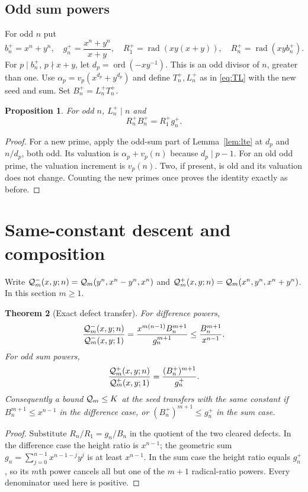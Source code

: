 \documentclass[11pt]{article}
\newtheorem{theorem}{Theorem}[section]
\newtheorem{proposition}[theorem]{Proposition}
\theoremstyle{definition}\newtheorem{definition}[theorem]{Definition}
\theoremstyle{remark}\newtheorem{remark}[theorem]{Remark}
\DeclareMathOperator{\rad}{rad}\DeclareMathOperator{\ord}{ord}\DeclareMathOperator{\lcm}{lcm}
\begin{document}
\subsection{Odd sum powers}
For odd $n$ put
\[
b_n^+=x^n+y^n,\quad g_n^+=\frac{x^n+y^n}{x+y},\quad
R_1^+=\rad(xy(x+y)),\quad R_n^+=\rad(xyb_n^+).
\]
For $p\mid b_n^+$, $p\nmid x+y$, let
$d_p=\ord(-xy^{-1})$. This is an odd divisor of $n$, greater than one.
Use $\alpha_p=v_p(x^{d_p}+y^{d_p})$ and define $T_n^+,L_n^+$ as in
\eqref{eq:TL} with the new seed and sum. Set $B_n^+=L_n^+T_n^+$.

\begin{proposition}\label{prop:sum}
For odd $n$, $L_n^+\mid n$ and
\begin{equation}\label{eq:sumbalance}
R_n^+B_n^+=R_1^+g_n^+.
\end{equation}
\end{proposition}
\begin{proof}
For a new prime, apply the odd-sum part of Lemma~\ref{lem:lte} at $d_p$ and
$n/d_p$, both odd. Its valuation is $\alpha_p+v_p(n)$ because $d_p\mid p-1$.
For an old odd prime, the valuation increment is $v_p(n)$. Two, if present,
is old and its valuation does not change. Counting the new primes once
proves the identity exactly as before.
\end{proof}

\section{Same-constant descent and composition}
Write $\mathcal Q_m^-(x,y;n)=\mathcal Q_m(y^n,x^n-y^n,x^n)$ and
$\mathcal Q_m^+(x,y;n)=\mathcal Q_m(x^n,y^n,x^n+y^n)$. In this section $m\ge1$.

\begin{theorem}[Exact defect transfer]\label{thm:transfer}
For difference powers,
\begin{equation}\label{eq:minusdefect}
\frac{\mathcal Q_m^-(x,y;n)}{\mathcal Q_m^-(x,y;1)}
=\frac{x^{m(n-1)}B_n^{m+1}}{g_n^{m+1}}
\le\frac{B_n^{m+1}}{x^{n-1}}.
\end{equation}
For odd sum powers,
\begin{equation}\label{eq:plusdefect}
\frac{\mathcal Q_m^+(x,y;n)}{\mathcal Q_m^+(x,y;1)}
=\frac{(B_n^+)^{m+1}}{g_n^+}.
\end{equation}
Consequently a bound $\mathcal Q_m\le K$ at the seed transfers with the same constant
if $B_n^{m+1}\le x^{n-1}$ in the difference case, or
$(B_n^+)^{m+1}\le g_n^+$ in the sum case.
\end{theorem}
\begin{proof}
Substitute $R_n/R_1=g_n/B_n$ in the quotient of the two cleared defects.
In the difference case the height ratio is $x^{n-1}$; the geometric sum
$g_n=\sum_{j=0}^{n-1}x^{n-1-j}y^j$ is at least $x^{n-1}$. In the sum case
the height ratio equals $g_n^+$, so its $m$th power cancels all but one of
the $m+1$ radical-ratio powers. Every denominator used here is positive.
\end{proof}
\end{document}
